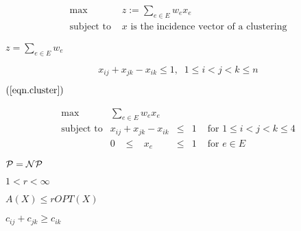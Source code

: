 {\newpage\clearpage
{}%
\begin{displaymath}
\begin{array}{ll}
 \max & z:=\sum_{e\in E}w_ex_e \\
  \mbox{subject to } & x \mbox{ is the incidence vector of a}
                         \mbox{ clustering}
\end{array}
\end{displaymath}%
\lthtmldisplayZ
\hfill\lthtmlcheckvsize\clearpage}

{\newpage\clearpage
{}%
$z=\sum_{e \in E}w_e$%
\lthtmlinlinemathZ
\hfill\lthtmlcheckvsize\clearpage}

{\newpage\clearpage
{}%
\begin{displaymath}
  x_{ij} + x_{jk} - x_{ik}  \leq  1, \;\;  1 \leq i <j<k \leq n
\end{displaymath}%
\lthtmldisplayZ
\hfill\lthtmlcheckvsize\clearpage}

{\newpage\clearpage
{}%
$(\ref{eqn.cluster})$%
\lthtmlinlinemathZ
\hfill\lthtmlcheckvsize\clearpage}

{\newpage\clearpage
{}%
\begin{displaymath}
 \begin{array}{lccll}
  \max & \sum_{e \in E} w_e x_e \\
  \mbox{subject to} & x_{ij}+x_{jk}-x_{ik} & \leq & 1 & \mbox{ for }
      1 \leq i < j < k \leq 4 \\
  & 0 \;\;\; \leq \;\;\;  x_e & \leq & 1 & \mbox{ for } e \in E
 \end{array}
\end{displaymath}%
\lthtmldisplayZ
\hfill\lthtmlcheckvsize\clearpage}

{\newpage\clearpage
{}%
$\cal{P}=\cal{NP}$%
\lthtmlinlinemathZ
\hfill\lthtmlcheckvsize\clearpage}

{\newpage\clearpage
{}%
$1 < r < \infty$%
\lthtmlinlinemathZ
\hfill\lthtmlcheckvsize\clearpage}

{\newpage\clearpage
{}%
$A(X) \leq rOPT(X)$%
\lthtmlinlinemathZ
\hfill\lthtmlcheckvsize\clearpage}

{\newpage\clearpage
{}%
$c_{ij}+c_{jk}\geq c_{ik}$%
\lthtmlinlinemathZ
\hfill\lthtmlcheckvsize\clearpage}

